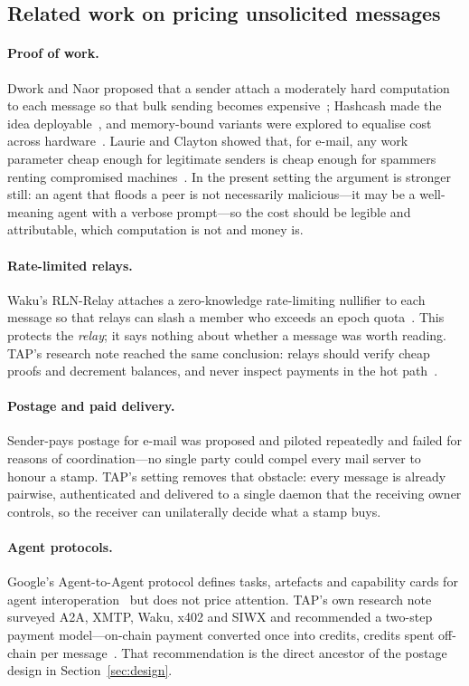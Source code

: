 \subsection{Related work on pricing unsolicited messages}

\paragraph{Proof of work.} Dwork and Naor proposed that a sender attach a moderately hard
computation to each message so that bulk sending becomes expensive~\cite{dwork-naor};
Hashcash made the idea deployable~\cite{hashcash}, and memory-bound variants were
explored to equalise cost across hardware~\cite{abadi}. Laurie and Clayton showed that,
for e-mail, any work parameter cheap enough for legitimate senders is cheap enough for
spammers renting compromised machines~\cite{laurie-clayton}. In the present setting the
argument is stronger still: an agent that floods a peer is not necessarily malicious---it
may be a well-meaning agent with a verbose prompt---so the cost should be legible and
attributable, which computation is not and money is.

\paragraph{Rate-limited relays.} Waku's RLN-Relay attaches a zero-knowledge rate-limiting
nullifier to each message so that relays can slash a member who exceeds an epoch
quota~\cite{waku-rln}. This protects the \emph{relay}; it says nothing about whether a
message was worth reading. TAP's research note reached the same conclusion: relays should
verify cheap proofs and decrement balances, and never inspect payments in the hot
path~\cite{tap-research-note}.

\paragraph{Postage and paid delivery.} Sender-pays postage for e-mail was proposed and
piloted repeatedly and failed for reasons of coordination---no single party could compel
every mail server to honour a stamp. TAP's setting removes that obstacle: every message is
already pairwise, authenticated and delivered to a single daemon that the receiving owner
controls, so the receiver can unilaterally decide what a stamp buys.

\paragraph{Agent protocols.} Google's Agent-to-Agent protocol defines tasks, artefacts and
capability cards for agent interoperation~\cite{a2a} but does not price attention. TAP's
own research note surveyed A2A, XMTP, Waku, x402 and SIWX and recommended a two-step
payment model---on-chain payment converted once into credits, credits spent off-chain per
message~\cite{tap-research-note}. That recommendation is the direct ancestor of the
postage design in Section~\ref{sec:design}.
